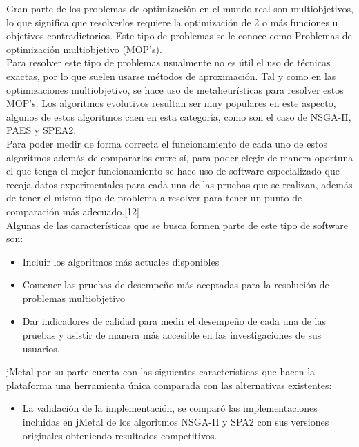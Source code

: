 Gran parte de los problemas de optimización en el mundo real son multiobjetivos, lo que significa que resolverlos requiere la optimización de 2 o más funciones u objetivos contradictorios. Este tipo de problemas se le conoce como Problemas de optimización multiobjetivo (MOP's).\\

Para resolver este tipo de problemas usualmente no es útil el uso de técnicas exactas, por lo que suelen usarse métodos de aproximación. Tal y como en las optimizaciones multiobjetivo, se hace uso de metaheurísticas para resolver estos MOP's. Los algoritmos evolutivos resultan ser muy populares en este aspecto, algunos de estos algoritmos caen en esta categoría, como son el caso de NSGA-II, PAES y SPEA2.\\

Para poder medir de forma correcta el funcionamiento de cada uno de estos algoritmos además de compararlos entre sí, para poder elegir de manera oportuna el que tenga el mejor funcionamiento se hace uso de software especializado que recoja datos experimentales para cada una de las pruebas que se realizan, además de tener el mismo tipo de problema a resolver para tener un punto de comparación más adecuado.[12]\\

Algunas de las características que se busca formen parte de este tipo de software son:

\begin{itemize}
\item Incluir los algoritmos más actuales disponibles
\item Contener las pruebas de desempeño más aceptadas para la resolución de problemas multiobjetivo
\item Dar indicadores de calidad para medir el desempeño de cada una de las pruebas y asistir de manera más accesible en las investigaciones de sus usuarios.
\end{itemize}

jMetal por su parte cuenta con las siguientes características que hacen la plataforma una herramienta única comparada con las alternativas existentes:

\begin{itemize}
\item La validación de la implementación, se comparó las implementaciones incluidas en jMetal de los algoritmos NSGA-II y SPA2 con sus versiones originales obteniendo resultados competitivos.\\
\end{itemize}

